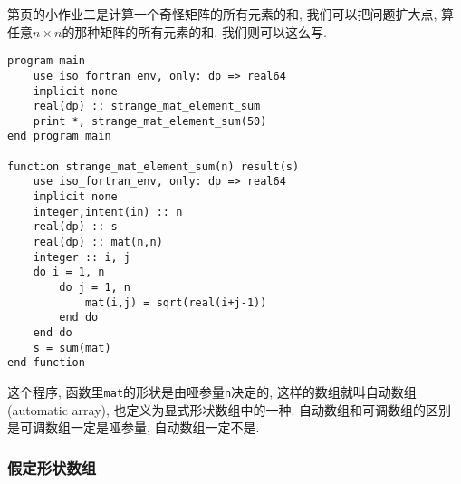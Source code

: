 第\pageref{hw_2}页的小作业二是计算一个奇怪矩阵的所有元素的和, 我们可以把问题扩大点, 算任意$n\times n$的那种矩阵的所有元素的和, 我们则可以这么写.
\begin{lstlisting}
program main
    use iso_fortran_env, only: dp => real64
    implicit none
    real(dp) :: strange_mat_element_sum
    print *, strange_mat_element_sum(50)
end program main

function strange_mat_element_sum(n) result(s)
    use iso_fortran_env, only: dp => real64
    implicit none
    integer,intent(in) :: n
    real(dp) :: s
    real(dp) :: mat(n,n)
    integer :: i, j
    do i = 1, n
        do j = 1, n
            mat(i,j) = sqrt(real(i+j-1))
        end do
    end do
    s = sum(mat)
end function
\end{lstlisting}
这个程序, 函数里\texttt{mat}的形状是由哑参量\texttt{n}决定的, 这样的数组就叫自动数组(automatic array), 也定义为显式形状数组中的一种. 自动数组和可调数组的区别是可调数组一定是哑参量, 自动数组一定不是.

\subsubsection{假定形状数组}

